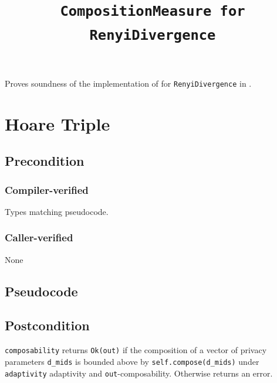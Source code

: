 \documentclass{article}
\title{\texttt{CompositionMeasure for RenyiDivergence}}
\author{\MichaelShoemateAuthor}
\date{}
\begin{document}
\maketitle

\contrib
Proves soundness of the implementation of 
for \texttt{RenyiDivergence} in .

\section{Hoare Triple}
\subsection*{Precondition}
\subsubsection*{Compiler-verified}
Types matching pseudocode.


\subsubsection*{Caller-verified}
None

\subsection*{Pseudocode}


\subsection*{Postcondition}
\begin{theorem}
  \texttt{composability} returns \texttt{Ok(out)} if the composition of a vector of privacy parameters \texttt{d\_mids}
  is bounded above by \texttt{self.compose(d\_mids)} under \texttt{adaptivity} adaptivity and \texttt{out}-composability.
  Otherwise returns an error.
\end{theorem}
\end{document}
